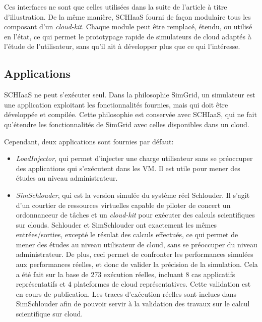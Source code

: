 \documentclass[parallelisme]{compas2017}
\begin{document}
Ces interfaces ne sont  que celles utilisées dans la suite  de l'article à titre
d'illustration.  De la même manière, SCHIaaS  fourni de façon modulaire tous les
composant d'un \textit{cloud-kit}.  Chaque module peut être remplacé, étendu, ou
utilisé en l'état,  ce qui permet le prototypage rapide  de simulateurs de cloud
adaptés à l'étude de l'utilisateur, sans qu'il  ait à développer plus que ce qui
l'intéresse.

\subsection{Applications}

SCHIaaS ne peut s'exécuter seul. Dans  la philosophie SimGrid, un simulateur est
une  application exploitant  les fonctionnalités  fournies, mais  qui doit  être
développée et  compilée.  Cette philosophie  est conservée avec SCHIaaS,  qui ne
fait qu'étendre les  fonctionnalités de SimGrid avec celles  disponibles dans un
cloud.

Cependant, deux applications sont fournies par défaut: 
\begin{itemize}
\item \emph{LoadInjector}, qui permet d'injecter  une charge utilisateur sans se
  préoccuper des  applications qui s'exécutent  dans les  VM. Il est  utile pour
  mener des études au niveau administrateur.
\item  \emph{SimSchlouder},  qui   est  la  version  simulée   du  système  réel
  Schlouder\cite{Michon2017}.  Il s'agit d'un  courtier de ressources virtuelles
  capable   de  piloter   de   concert   un  ordonnanceur   de   tâches  et   un
  \textit{cloud-kit}  pour  exécuter  des   calculs  scientifiques  sur  clouds.
  Schlouder et SimSchlouder ont exactement les mêmes entrées/sorties, excepté le
  résulat des  calculs effectués, ce  qui permet de  mener des études  au niveau
  utilisateur de  cloud, sans se  préoccuper du niveau administrateur.  De plus,
  ceci permet de confronter les  performances simulées aux performances réelles,
  et donc de valider la précision de la  simulation. Cela a été fait sur la base
  de  273 exécution  réelles, incluant  8  cas applicatifs  représentatifs et  4
  plateformes  de  cloud  représentatives.  Cette validation  est  en  cours  de
  publication.  Les traces  d'exécution réelles  sont inclues  dans SimSchlouder
  afin de pouvoir servir à la  validation des travaux sur le calcul scientifique
  sur cloud.
\end{itemize}
\end{document}
